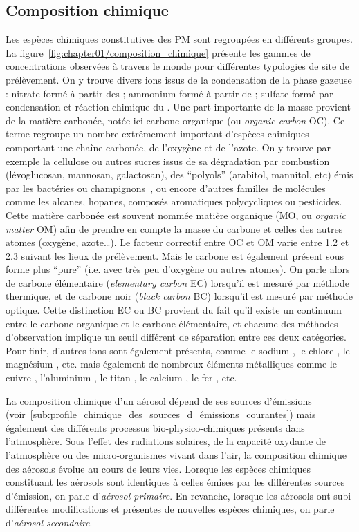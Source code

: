 \subsection{Composition chimique}%
\label{ssub:composition_chimique}

Les espèces chimiques constitutives des PM sont regroupées en différents groupes. La
figure~\ref{fig:chapter01/composition_chimique} présente les gammes de concentrations
observées à travers le monde pour différentes typologies de site de prélèvement.
On y trouve divers ions issus de la condensation de la phase gazeuse : nitrate \NOt formé à
partir des ; ammonium \NHq formé à partir de \NHt; sulfate \SOq formé par
condensation et réaction chimique du .
Une part importante de la masse provient de la matière carbonée, notée ici
carbone organique (ou \textit{organic carbon} OC). Ce terme regroupe un nombre extrêmement
important d'espèces chimiques comportant une chaîne carbonée, de l'oxygène et
de l'azote. On y trouve par exemple la cellulose ou autres sucres issus de sa
dégradation par combustion (lévoglucosan, mannosan, galactosan), des ``polyols'' (arabitol,
mannitol, etc) émis par les bactéries ou champignons~\autocite{samakePolyols2019}, ou encore
d'autres familles de molécules comme les alcanes, hopanes, composés aromatiques
polycycliques ou pesticides. Cette matière carbonée est souvent nommée matière
organique (MO, ou \textit{organic matter} OM) afin de prendre en compte la masse du
carbone et celles des autres atomes (oxygène, azote…). Le facteur correctif entre OC et OM
varie entre 1.2 et 2.3 suivant les lieux de prélèvement.
Mais le carbone est également présent sous forme plus ``pure'' (i.e. avec très peu
d'oxygène ou autres atomes).
On parle alors de carbone élémentaire (\textit{elementary carbon} EC) lorsqu'il est mesuré
par méthode thermique, et de carbone noir (\textit{black carbon} BC) lorsqu'il est mesuré
par méthode optique. Cette distinction EC ou BC provient du fait qu'il existe un continuum
entre le carbone organique et le carbone élémentaire, et chacune des méthodes
d'observation implique un seuil différent de séparation entre ces deux catégories.
Pour finir, d'autres ions sont également présents, comme le sodium , le chlore
, le magnésium , etc. mais également de nombreux éléments métalliques
comme le cuivre , l'aluminium , le titan , le calcium , le fer
, etc.

La composition chimique d'un aérosol dépend de ses sources d'émissions
(voir~\ref{sub:profile_chimique_des_sources_d_émissions_courantes}) mais également des
différents processus bio-physico-chimiques présents dans l'atmosphère. Sous l'effet des
radiations solaires, de la capacité oxydante de l'atmosphère ou des micro-organismes
vivant dans l'air, la composition chimique des aérosols évolue au cours de leurs vies.
Lorsque les espèces chimiques constituant les aérosols sont identiques à celles émises par
les différentes sources d'émission, on parle d'\textit{aérosol primaire}. En revanche,
lorsque les aérosols ont subi différentes modifications et présentes de nouvelles espèces
chimiques, on parle d'\textit{aérosol secondaire}.

